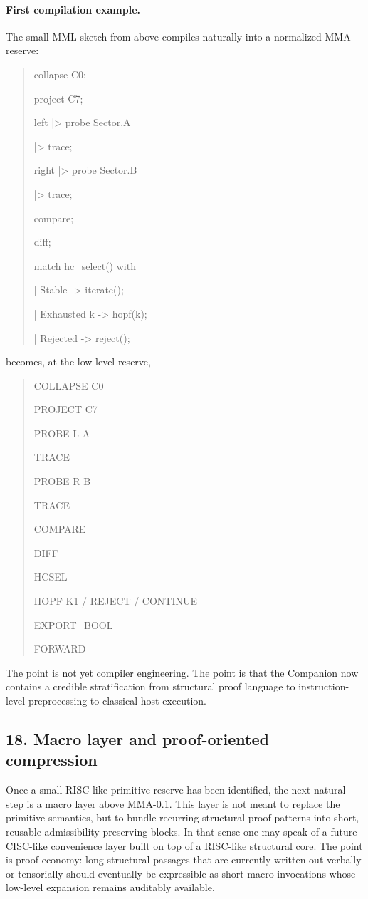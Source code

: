 \paragraph{First compilation example.}
The small MML sketch from above compiles naturally into a normalized MMA reserve:
\begin{quote}\ttfamily\scriptsize
collapse C0;\par
project C7;\par
left |> probe Sector.A\par
\quad |> trace;\par
right |> probe Sector.B\par
\quad |> trace;\par
compare;\par
diff;\par
match hc\_select() with\par
\quad | Stable -> iterate();\par
\quad | Exhausted k -> hopf(k);\par
\quad | Rejected -> reject();
\end{quote}
becomes, at the low-level reserve,
\begin{quote}
\ttfamily
COLLAPSE C0 \par
PROJECT C7 \par
PROBE L A \par
TRACE \par
PROBE R B \par
TRACE \par
COMPARE \par
DIFF \par
HCSEL \par
HOPF K1 / REJECT / CONTINUE \par
EXPORT\_BOOL \par
FORWARD
\end{quote}
The point is not yet compiler engineering. The point is that the Companion now contains a credible stratification from structural proof language to instruction-level preprocessing to classical host execution.

\subsection*{18. Macro layer and proof-oriented compression}
Once a small RISC-like primitive reserve has been identified, the next natural step is a macro layer above MMA-0.1. This layer is not meant to replace the primitive semantics, but to bundle recurring structural proof patterns into short, reusable admissibility-preserving blocks. In that sense one may speak of a future CISC-like convenience layer built on top of a RISC-like structural core. The point is proof economy: long structural passages that are currently written out verbally or tensorially should eventually be expressible as short macro invocations whose low-level expansion remains auditably available.

